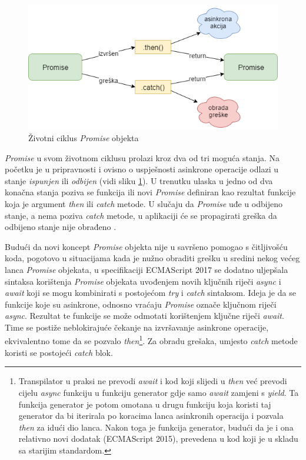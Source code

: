 \documentclass[times, utf8, diplomski, numeric]{fer}
\newcommand{\razmakp}{\vspace{18pt}}
\begin{document}
\begin{figure}[!htb] %
    \centering
    \includegraphics[width=14cm]{images/promise.png}
    \caption{Životni ciklus \emph{Promise} objekta}
    \label{fig:promise_lifecycle}
\end{figure}

\newpage
\emph{Promise} u svom životnom ciklusu prolazi kroz dva od tri moguća stanja.
Na početku je u pripravnosti  i ovisno o uspješnosti asinkrone operacije odlazi u stanje \emph{ispunjen}  ili \emph{odbijen}  (vidi sliku \ref{fig:promise_lifecycle}).
U trenutku ulaska u jedno od dva konačna stanja poziva se funkcija ili novi \emph{Promise} definiran kao rezultat funkcije koja je argument \emph{then} ili \emph{catch} metode.
U slučaju da \emph{Promise} uđe u odbijeno stanje, a nema poziva \emph{catch} metode, u aplikaciji će se propagirati greška da odbijeno stanje nije obrađeno .\citep{mdn_promise}

\razmakp

Budući da novi koncept \emph{Promise} objekta nije u savršeno pomogao s čitljivošću koda, pogotovo u situacijama kada je nužno obraditi grešku u sredini nekog većeg lanca \emph{Promise} objekata, u specifikaciji ECMAScript 2017 se dodatno uljepšala sintaksa korištenja \emph{Promise} objekata uvođenjem novih ključnih riječi \emph{async} i \emph{await} koji se mogu kombinirati s postojećom \emph{try} i \emph{catch} sintaksom.
Ideja je da se funkcije koje su asinkrone, odnosno vraćaju \emph{Promise} označe ključnom riječi \emph{async}.
Rezultat te funkcije se može odmotati korištenjem ključne riječi \emph{await}.
Time se postiže neblokirajuće čekanje na izvršavanje asinkrone operacije, ekvivalentno tome da se pozvalo \emph{then}\footnote{
    Transpilator u praksi ne prevodi \emph{await} i kod koji slijedi u \emph{then} već prevodi cijelu \emph{async} funkciju u funkciju generator  gdje samo \emph{await} zamjeni s \emph{yield}.
    Ta funkcija generator je potom omotana u drugu funkciju koja koristi taj generator da bi iterirala po koracima lanca asinkronih operacija i pozvala \emph{then} za idući dio lanca. Nakon toga je funkcija generator, budući da je i ona relativno novi dodatak (ECMAScript 2015), prevedena u kod koji je u skladu sa starijim standardom.
}.
Za obradu grešaka, umjesto \emph{catch} metode koristi se postojeći \emph{catch} blok.
\end{document}
